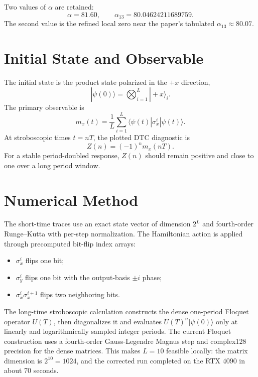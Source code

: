 \documentclass[11pt,a4paper]{article}
\begin{document}
Two values of \(\alpha\) are retained:
\[
\alpha=81.60,\qquad \alpha_{13}=80.04624211689759.
\]
The second value is the refined local zero near the paper's tabulated \(\alpha_{13}\approx80.07\).

\section{Initial State and Observable}

The initial state is the product state polarized in the \(+x\) direction,
\begin{equation}
|\psi(0)\rangle=\bigotimes_{i=1}^{L}|+x\rangle_i.
\end{equation}
The primary observable is
\begin{equation}
m_x(t)=\frac{1}{L}\sum_{i=1}^{L}
\langle\psi(t)|\sigma_x^i|\psi(t)\rangle.
\end{equation}
At stroboscopic times \(t=nT\), the plotted DTC diagnostic is
\begin{equation}
Z(n)=(-1)^n m_x(nT).
\end{equation}
For a stable period-doubled response, \(Z(n)\) should remain positive and close to one over a long period window.

\section{Numerical Method}

The short-time traces use an exact state vector of dimension \(2^L\) and fourth-order Runge--Kutta with per-step normalization. The Hamiltonian action is applied through precomputed bit-flip index arrays:
\begin{itemize}
  \item \(\sigma_x^i\) flips one bit;
  \item \(\sigma_y^i\) flips one bit with the output-basis \(\pm i\) phase;
  \item \(\sigma_x^i\sigma_x^{i+1}\) flips two neighboring bits.
\end{itemize}

The long-time stroboscopic calculation constructs the dense one-period Floquet operator \(U(T)\), then diagonalizes it and evaluates \(U(T)^n|\psi(0)\rangle\) only at linearly and logarithmically sampled integer periods. The current Floquet construction uses a fourth-order Gauss-Legendre Magnus step and complex128 precision for the dense matrices. This makes \(L=10\) feasible locally: the matrix dimension is \(2^{10}=1024\), and the corrected run completed on the RTX 4090 in about 70 seconds.
\end{document}
